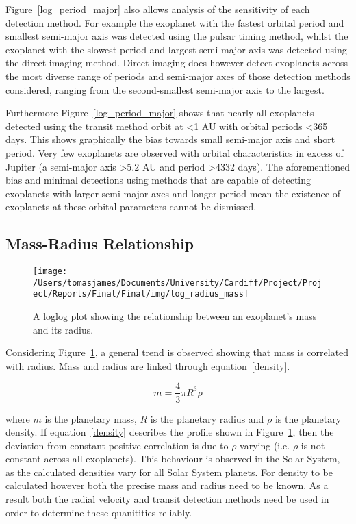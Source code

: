 \documentclass{report}
\begin{document}
Figure~\ref{log_period_major} also allows analysis of the sensitivity of each detection method. For example the exoplanet with the fastest orbital period and smallest semi-major axis was detected using the pulsar timing method, whilst the exoplanet with the slowest period and largest semi-major axis was detected using the direct imaging method. Direct imaging does however detect exoplanets across the most diverse range of periods and semi-major axes of those detection methods considered, ranging from the second-smallest semi-major axis to the largest.

Furthermore Figure~\ref{log_period_major} shows that nearly all exoplanets detected using the transit method orbit at \textless 1 AU with orbital periods \textless 365 days. This shows graphically the bias towards small semi-major axis and short period. Very few exoplanets are observed with orbital characteristics in excess of Jupiter (a semi-major axis \textgreater 5.2 AU and period \textgreater 4332 days). The aforementioned bias and minimal detections using methods that are capable of detecting exoplanets with larger semi-major axes and longer period mean the existence of exoplanets at these orbital parameters cannot be dismissed.

\subsection*{Mass-Radius Relationship}

\begin{figure}[H]
\centering
    \texttt{[image: /Users/tomasjames/Documents/University/Cardiff/Project/Project/Reports/Final/Final/img/log\_radius\_mass]}
\caption{A loglog plot showing the relationship between an exoplanet's mass and its radius.}\label{log_radius_mass}
\end{figure}

Considering Figure~\ref{log_radius_mass}, a general trend is observed showing that mass is correlated with radius. Mass and radius are linked through equation~\ref{density}.

\begin{equation} \label{density}
    m = \frac{4}{3}\pi R^3 \rho
\end{equation}

 where $m$ is the planetary mass, $R$ is the planetary radius and $\rho$ is the planetary density. If equation~\ref{density} describes the profile shown in Figure~\ref{log_radius_mass}, then the deviation from constant positive correlation is due to $\rho$ varying (i.e. $\rho$ is not constant across all exoplanets). This behaviour is observed in the Solar System, as the calculated densities vary for all Solar System planets. For density to be calculated however both the precise mass and radius need to be known. As a result both the radial velocity and transit detection methods need be used in order to determine these quanitities reliably.
\end{document}
